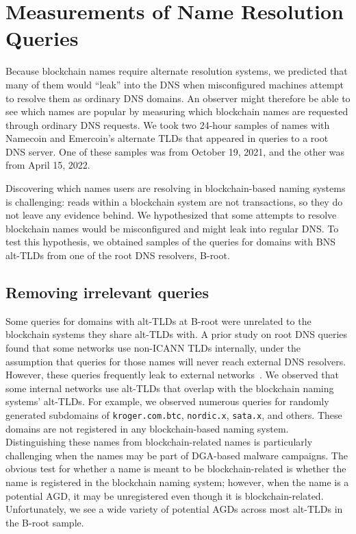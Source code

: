 \section{Measurements of Name Resolution Queries}
\label{sec:b-root}

Because blockchain names require alternate resolution systems, we predicted 
that many of them would ``leak'' into the DNS when misconfigured machines 
attempt to resolve them as ordinary DNS domains. An observer might therefore be 
able to see which names are popular by measuring which blockchain names are 
requested through ordinary DNS requests. We took two 24-hour samples of names 
with Namecoin and Emercoin's alternate TLDs that appeared in 
queries to a root DNS server. One of these samples was from October 19, 2021, 
and the other was from April 15, 2022.

Discovering which names users are resolving in blockchain-based 
naming systems is challenging: reads within a 
blockchain system are not transactions, so they do not leave any evidence 
behind. We hypothesized that some attempts to resolve blockchain names 
would be misconfigured and might leak into regular DNS. To test this 
hypothesis, we obtained samples of the queries for domains with BNS alt-TLDs 
from one of the root DNS resolvers, B-root.

\subsection{Removing irrelevant queries}

Some queries for domains with alt-TLDs at B-root were unrelated to the 
blockchain systems they share alt-TLDs with. A prior study on root DNS queries 
found that some networks use non-ICANN TLDs internally, under the assumption 
that queries for those names will never reach external DNS resolvers. However, 
these queries frequently leak to external networks~\cite{chen_wpad_2016}. We 
observed that some internal networks use alt-TLDs that overlap with the 
blockchain naming systems' alt-TLDs. For example, we observed numerous queries 
for randomly generated subdomains of 
\texttt{kroger.com.btc}, \texttt{nordic.x}, \texttt{sata.x}, and others. These 
domains are not registered in any blockchain-based naming system. 
Distinguishing these names from 
blockchain-related names is particularly challenging when the names may be part 
of DGA-based malware campaigns. The obvious test for whether a name is meant to 
be blockchain-related is whether the name is registered in the blockchain 
naming system; however, when the name is a potential AGD, it may be 
unregistered even though it is blockchain-related. Unfortunately, we see a wide 
variety of potential AGDs across most alt-TLDs in the B-root sample.

